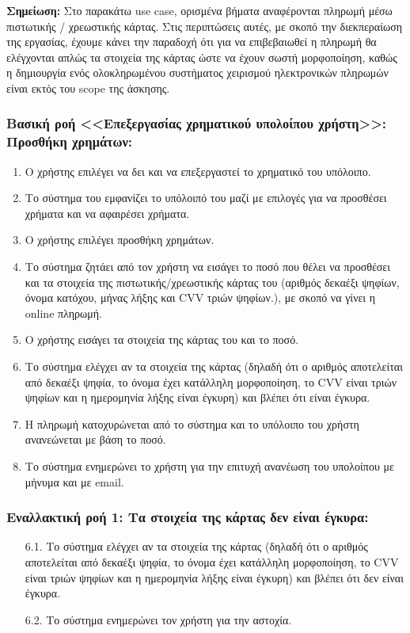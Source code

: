 \documentclass[12pt,a4paper]{article}
\begin{document}
\textbf{Σημείωση: } Στο παρακάτω use case, ορισμένα βήματα αναφέρονται πληρωμή μέσω πιστωτικής / χρεωστικής κάρτας. Στις περιπτώσεις αυτές, με σκοπό την διεκπεραίωση της εργασίας, έχουμε κάνει την παραδοχή ότι για να επιβεβαιωθεί η πληρωμή θα ελέγχονται απλώς τα στοιχεία της κάρτας ώστε να έχουν σωστή μορφοποίηση, καθώς η δημιουργία ενός ολοκληρωμένου συστήματος χειρισμού ηλεκτρονικών πληρωμών είναι εκτός του scope της άσκησης.

\subsubsection*{Βασική ροή <<Επεξεργασίας χρηματικού υπολοίπου χρήστη>>: Προσθήκη χρημάτων:}
\begin{enumerate}
    \item Ο χρήστης επιλέγει να δει και να επεξεργαστεί το χρηματικό του υπόλοιπο. 
    \item Το σύστημα του εμφανίζει το υπόλοιπό του μαζί με επιλογές για να προσθέσει χρήματα και να αφαιρέσει χρήματα.
    \item Ο χρήστης επιλέγει προσθήκη χρημάτων.
    \item Το σύστημα ζητάει από τον χρήστη να εισάγει το ποσό που θέλει να προσθέσει και τα στοιχεία της πιστωτικής/χρεωστικής κάρτας του (αριθμός δεκαέξι ψηφίων, όνομα κατόχου, μήνας λήξης και CVV τριών ψηφίων.), με σκοπό να γίνει η online πληρωμή.
    \item Ο χρήστης εισάγει τα στοιχεία της κάρτας του και το ποσό.
    \item Το σύστημα ελέγχει αν τα στοιχεία της κάρτας (δηλαδή ότι ο αριθμός αποτελείται από δεκαέξι ψηφία, το όνομα έχει κατάλληλη μορφοποίηση, το CVV είναι τριών ψηφίων και η ημερομηνία λήξης είναι έγκυρη) και βλέπει ότι είναι έγκυρα.
    \item H πληρωμή κατοχυρώνεται από το σύστημα και το υπόλοιπο του χρήστη ανανεώνεται με βάση το ποσό.
    \item Το σύστημα ενημερώνει το χρήστη για την επιτυχή ανανέωση του υπολοίπου με μήνυμα και με email.
\end{enumerate}

\subsubsection*{Εναλλακτική ροή 1: Τα στοιχεία της κάρτας δεν είναι έγκυρα:}
\begin{enumerate}
    \item [6.1.] Το σύστημα ελέγχει αν τα στοιχεία της κάρτας (δηλαδή ότι ο αριθμός αποτελείται από δεκαέξι ψηφία, το όνομα έχει κατάλληλη μορφοποίηση, το CVV είναι τριών ψηφίων και η ημερομηνία λήξης είναι έγκυρη) και βλέπει ότι δεν είναι έγκυρα.
    \item [6.2.] Το σύστημα ενημερώνει τον χρήστη για την αστοχία.
\end{enumerate}
\end{document}
